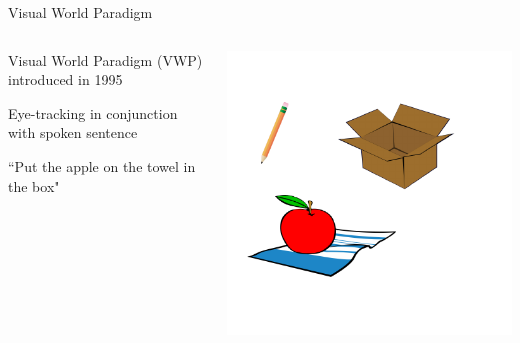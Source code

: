 \documentclass{beamer}
\begin{document}
\begin{frame}{Visual World Paradigm}\large
\begin{columns}
\begin{column}{0.45\textwidth}

Visual World Paradigm (VWP) introduced in 1995 \vspace{4mm}

Eye-tracking in conjunction with spoken sentence  \vspace{4mm}

``Put the apple on the towel in the box" 


\end{column}
\begin{column}{0.5\textwidth}  %
\begin{center}
\includegraphics[scale=.9]{img/towel_apple_box.pdf}
\end{center}
\end{column}
\end{columns}
\end{frame}

\end{document}
